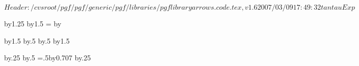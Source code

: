 %
%
%

\ProvidesFileRCS[v\pgfversion] $Header: /cvsroot/pgf/pgf/generic/pgf/libraries/pgflibraryarrows.code.tex,v 1.6 2007/03/09 17:49:32 tantau Exp $



\pgfarrowsdeclare{[}{]}
{
  \@tempdima=1pt%
  \advance\@tempdima by1.25\pgflinewidth%
  \pgfarrowsleftextend{+-\@tempdima}
  \pgfarrowsrightextend{+.5\pgflinewidth}
}
{
  \@tempdima=2pt%
  \advance\@tempdima by1.5\pgflinewidth%
  \@tempdimb=\@tempdima%
  \advance\@tempdimb by\pgflinewidth%
  \pgfsetdash{}{+0pt}
  \pgfsetmiterjoin
  \pgfsetbuttcap
  \pgfpathlineto{\pgfqpoint{0pt}{\@tempdima}}
  \pgfusepathqstroke
}

\pgfarrowsdeclarereversed{]}{[}{[}{]}



\pgfarrowsdeclare{(}{)}
{
  \@tempdima=2pt%
  \advance\@tempdima by1.5\pgflinewidth%
  \@tempdima\advance\@tempdimb by.5\pgflinewidth%
  \pgfarrowsrightextend{+\@tempdimb}
  \@tempdima\advance\@tempdimb by.5\pgflinewidth%
  \pgfarrowsleftextend{+-\@tempdimb}
}
{
  \@tempdima=2pt%
  \advance\@tempdima by1.5\pgflinewidth%
  \pgfsetdash{}{+0pt}
  \pgfsetroundcap
  \pgfpathcurveto
  {}
  {}
  {}
  \pgfusepathqstroke
}

\pgfarrowsdeclarereversed{)}{(}{(}{)}





{
  \@tempdima=0.3pt%
  \advance\@tempdima by.25\pgflinewidth%
  \@tempdima\advance\@tempdimb by.5\pgflinewidth%
  \pgfarrowsleftextend{+-\@tempdimb}
  \@tempdimb=.5\@tempdima\advance\@tempdimb by0.707\pgflinewidth%
  \pgfarrowsrightextend{+\@tempdimb}
}
{
  \@tempdima=0.3pt%
  \advance\@tempdima by.25\pgflinewidth%
  \pgfsetdash{}{+0pt}
  \pgfsetroundcap
  \pgfsetmiterjoin
  \pgfusepathqstroke
}

